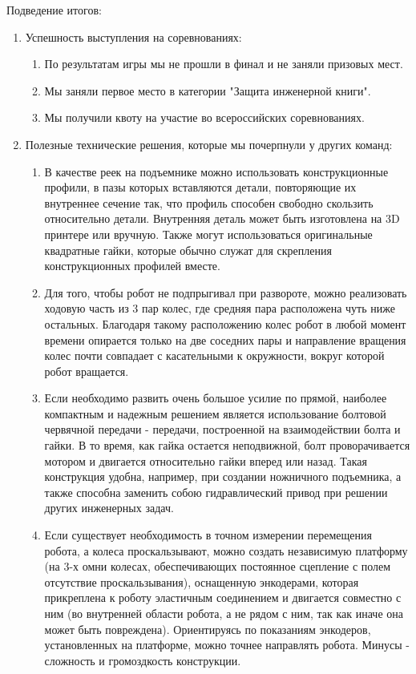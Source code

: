 Подведение итогов:
\begin{enumerate}
  \item Успешность выступления на соревнованиях:
  \begin{enumerate}
	\item По результатам игры мы не прошли в финал и не заняли призовых мест.
	
	\item Мы заняли первое место в категории "Защита инженерной книги".
	
	\item Мы получили квоту на участие во всероссийских соревнованиях.
	
  \end{enumerate}
  
  \item Полезные технические решения, которые мы почерпнули у других команд:
  \begin{enumerate}
  	
	\item В качестве реек на подъемнике можно использовать конструкционные профили, в пазы которых вставляются детали, повторяющие их внутреннее сечение так, что профиль способен свободно скользить относительно детали. Внутренняя деталь может быть изготовлена на 3D принтере или вручную. Также могут использоваться оригинальные квадратные гайки, которые обычно служат для скрепления конструкционных профилей вместе.
	
	\item Для того, чтобы робот не подпрыгивал при развороте, можно реализовать ходовую часть из 3 пар колес, где средняя пара расположена чуть ниже остальных. Благодаря такому расположению колес робот в любой момент времени опирается только на две соседних пары и направление вращения колес почти совпадает с касательными к окружности, вокруг которой робот вращается.
	
	\item Если необходимо развить очень большое усилие по прямой, наиболее компактным и надежным решением является использование болтовой червячной передачи - передачи, построенной на взаимодействии болта и гайки. В то время, как гайка остается неподвижной, болт проворачивается мотором и двигается относительно гайки вперед или назад. Такая конструкция удобна, например, при создании ножничного подъемника, а также способна заменить собою гидравлический привод при решении других инженерных задач.
	
	\item Если существует необходимость в точном измерении перемещения робота, а колеса проскальзывают, можно создать независимую платформу (на 3-х омни колесах, обеспечивающих постоянное сцепление с полем отсутствие проскальзывания), оснащенную энкодерами, которая прикреплена к роботу эластичным соединением и двигается совместно с ним (во внутренней области робота, а не рядом с ним, так как иначе она может быть повреждена). Ориентируясь по показаниям энкодеров, установленных на платформе, можно точнее направлять робота. Минусы - сложность и громоздкость конструкции.
	

\end{enumerate}
\end{enumerate}
